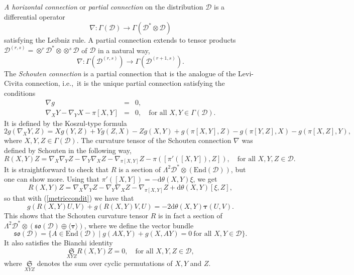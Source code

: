 \documentclass{amsart}
\theoremstyle{plain}
\theoremstyle{definition}
\def\so{\mathfrak{so}}
\newcommand{\bt}{{\boldsymbol{\tau}}}
\newcommand{\Su}{\mathfrak{S}}
\newcommand{\1}{\mathbf{1}}
\newcommand{\D}{{\mathcal D}}
\renewcommand{\d}{\mathrm{d}}
\newcommand{\+}{\oplus}
\begin{document}
{\it A horizontal  connection} or {\em partial connection} on the distribution $\D$ is a differential operator 
\begin{equation}\label{nablaD}
\nabla:\Gamma(\D) \longrightarrow \Gamma(\D^*\otimes \D)\end{equation} 
satisfying the Leibniz rule. A partial connection extends to  tensor products $\mathcal \D^{(r,s)}=\otimes^r \D^*\otimes \otimes^s\D$ of $\D$ in a natural way,
\[\nabla: \Gamma ( \mathcal \D^{(r,s)})\longrightarrow\Gamma(\mathcal \D^{(r+1,s)}).\]
The {\em Schouten connection} is a partial connection that is the analogue of the Levi-Civita connection, i.e.,~it is the unique partial connection satisfying the conditions 
\begin{eqnarray}
\label{metriccondit}
\nabla g&=&0,
\\
\label{torsioncondit}\nabla_X Y-\nabla_Y X-\pi[X,Y]&=&0, \quad\text{for all $X,Y\in \Gamma(\D)$.}
\end{eqnarray} It is defined by the Koszul-type formula
\begin{equation}\label{SchoutenCon}
2g(\nabla_X Y,Z)= Xg(Y,Z) +Yg(Z,X) - Zg(X,Y)+ g(\pi[X,Y],Z)- g(\pi[Y,Z],X)- g(\pi[X,Z],Y),
\end{equation} where $X,Y,Z\in\Gamma(\D)$.
The curvature tensor of the Schouten connection $\nabla$ was defined by Schouten
in the following way,
\begin{equation}\label{Schouten}
R(X,Y)Z=\nabla_X\nabla_Y Z-\nabla_Y\nabla_X Z-\nabla_{\pi[X,Y]}Z-\pi\left([\pi' ([X,Y]),Z]\right),\quad \text{for all } X,Y,Z\in\D.
\end{equation}
It is straightforward to check that $R$ is a section of $\Lambda^2\D^*\otimes (\mathrm{End}(\D))$, but one can show more. 
Using that  $\pi'([X,Y])=-\d \theta(X,Y)\xi$, we get
\begin{equation}\label{Schouten2}
R(X,Y)Z=\nabla_X\nabla_Y Z-\nabla_Y\nabla_X Z-\nabla_{\pi[X,Y]}Z
+\d\theta(X,Y)[\xi,Z],
\end{equation}
so that with (\ref{metriccondit}) we have that 
\begin{equation}
\label{SCTsym}
g(R(X,Y)U,V)+g(R(X,Y)V,U)=-2\d\theta(X,Y) \bt(U,V).\end{equation}
This shows that the Schouten curvature tensor $R$ is in fact a section of $\Lambda^2\D^*\otimes \left(\so(\D)\+ \langle \bt\rangle \right)$, where we define the vector bundle
\[\so(\D)=\{A\in \mathrm{End}(\D) \mid g(AX,Y) +g(X,AY)=0\ \text{for all } X,Y\in \D\}.\]
It also satisfies the Bianchi identity 
\begin{equation}\label{BianchiSch}
\underset{X Y Z}{\Su} R(X,Y)Z=0,  \quad\text{for all } X,Y,Z\in\D,
\end{equation}
where $\underset{X Y Z}{\Su}$ denotes the  sum over cyclic permutations of $X, Y$ and $ Z$.
\end{document}
